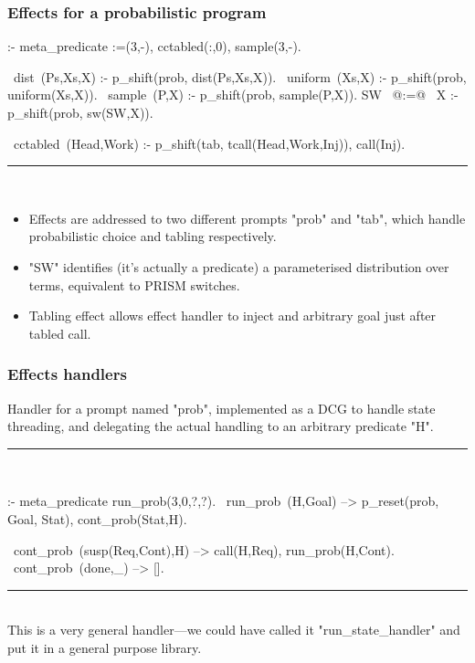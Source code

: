 \documentclass[usenames,dvipsnames]{beamer}
\newenvironment{fframe}[1][untitled]{\begin{frame}[fragile,environment=fframe]\frametitle{{#1}}}{\end{frame}}
\newenvironment{isframe}[1][untitled]{\begin{frame}[fragile=singleslide,environment=isframe]\frametitle{#1}}{\end{frame}}
\begin{document}
\begin{fframe}[Effects for a probabilistic program]
\begin{prolog}[xleftmargin=0em,basicstyle=\small]
  :- meta_predicate :=(3,-), cctabled(:,0), sample(3,-).

  ~dist~(Ps,Xs,X) :- p_shift(prob, dist(Ps,Xs,X)).
  ~uniform~(Xs,X) :- p_shift(prob, uniform(Xs,X)).
  ~sample~(P,X)   :- p_shift(prob, sample(P,X)).
  SW ~@:=@~ X       :- p_shift(prob, sw(SW,X)).

  ~cctabled~(Head,Work) :- p_shift(tab, tcall(Head,Work,Inj)), call(Inj).
\end{prolog}%
\vspace{-1.5em}
\rule{\linewidth}{0.4pt}\\
\begin{itemize}
  \item<1-> Effects are addressed to two different prompts "prob" and "tab", which handle
probabilistic choice and tabling respectively.

  \item<2-> "SW" identifies (it's actually a predicate) a parameterised distribution over terms, equivalent
to PRISM switches.

  \item<3-> Tabling effect allows effect handler to inject and arbitrary goal just after tabled call.
\end{itemize}

\end{fframe}

\begin{isframe}[Effects handlers]
Handler for a prompt named "prob", implemented as a DCG to handle
state threading, and delegating the actual handling to an arbitrary
predicate "H".

\rule{\linewidth}{0.4pt}\\
\begin{prolog}[xleftmargin=0em,basicstyle=\small]
  :- meta_predicate run_prob(3,0,?,?).
  ~run_prob~(H,Goal) --> {p_reset(prob, Goal, Stat)}, cont_prob(Stat,H).

  ~cont_prob~(susp(Req,Cont),H) --> call(H,Req), run_prob(H,Cont).
  ~cont_prob~(done,_) --> [].
\end{prolog}
\vspace{-1.5em}
\rule{\linewidth}{0.4pt}\\
This is a very general handler---we could have called it "run_state_handler"
and put it in a general purpose library.
\end{isframe}
\end{document}

